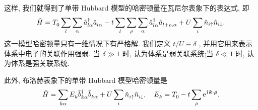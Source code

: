 这样, 我们就得到了单带 Hubbard 模型的哈密顿量在瓦尼尔表象下的表达式, 即
\begin{equation}
   \hat H=T^{}_0\sum_l\sum_\alpha \hat a_{l\alpha}^\dagger \hat a_{l\alpha}^{}-t\sum_l\sum_\rho\sum_\alpha\hat a_{l\alpha}^\dagger \hat a_{l+\rho, \alpha}^{}+U\sum_i\hat n_{i\uparrow}\hat n_{i\downarrow}. 
\end{equation}
这一模型哈密顿量只有一维情况下有严格解. 我们定义 $t/U\equiv \delta$ , 并用它用来表示体系中电子的关联作用强弱. 当 $\delta\gg 1$ 时, 认为体系是弱关联系统;当 $\delta\ll 1$ 时, 认为体系是强关联系统. 

此外, 布洛赫表象下的单带 Hubbard 模型哈密顿量是
\begin{equation}
   \hat H=\sum_{ k\alpha}E_{k}^{ }\hat b_{ k \alpha}^\dagger \hat b_{ k \alpha}^{ }+U\sum_i\hat n^{}_{i\uparrow}\hat n^{}_{i\downarrow}, \quad E^{}_k=T^{}_0-t\sum_\rho\mathrm{e}^{\hspace{0.1em}\mathrm{i}\hspace{0.1em}\boldsymbol{k}\cdot \boldsymbol{\rho}}. 
\end{equation}
